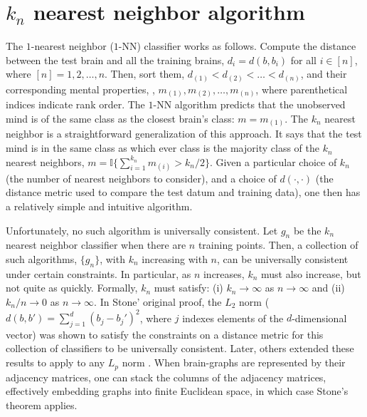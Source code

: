 \documentclass{article}
\newcommand{\conv}{\rightarrow}
\newcommand{\PP}{\mathbb{P}}           %
\newcommand{\II}{\mathbb{I}}           %
\newcommand{\Real}{\mathbb{R}}           %
\providecommand{\mc}[1]{\mathcal{#1}}
\begin{document}
\section{$k_n$ nearest neighbor algorithm} %
\label{sec:knn}



The $1$-nearest neighbor ($1$-NN) classifier works as follows.  Compute the distance between the test brain and all the training brains, $d_i=d(b,b_i)$ for all $i \in [n]$, where $[n]=1,2,\ldots, n$.  Then, sort them, $d_{(1)} < d_{(2)} < \ldots < d_{(n)}$, and their corresponding mental properties, , $m_{(1)}, m_{(2)}, \ldots, m_{(n)}$, where parenthetical indices indicate rank order.  %
The $1$-NN algorithm predicts that the unobserved mind is of the same class as the closest brain's class: $m=m_{(1)}$.  The $k_n$ nearest neighbor is a straightforward generalization of this approach.  It says that the test mind is in the same class as which ever class is the majority class of the $k_n$ nearest neighbors, $m=\II\{\sum_{i=1}^{k_n} m_{(i)} > k_n/2\}$.  Given a particular choice of $k_n$ (the number of nearest neighbors to consider), and a choice of $d(\cdot,\cdot)$ (the distance metric used to compare the test datum and training data), one then has a relatively simple and intuitive algorithm.  

Unfortunately, no such algorithm is universally consistent.  Let $g_n$ be the $k_n$ nearest neighbor classifier when there are $n$ training points.  Then, a collection of such algorithms, $\{g_n\}$,  with $k_n$ increasing with $n$, can be universally consistent under certain constraints. In particular, as $n$ increases, $k_n$ must also increase, but not quite as quickly.  Formally, $k_n$ must satisfy: (i) $k_n \conv \infty$ as $n \conv \infty$ and (ii) $k_n/n \conv 0$ as $n\conv\infty$. In Stone' original proof, the $L_2$ norm ($d(b,b')=\sum_{j=1}^d (b_j-b_j')^2$, where $j$ indexes elements of the $d$-dimensional vector) was shown to satisfy the constraints on a distance metric for this collection of classifiers to be universally consistent.  Later, others extended these results to apply to any $L_p$ norm \cite{DGL96}.  When brain-graphs are represented by their adjacency matrices, one can stack the columns of the adjacency matrices, effectively embedding graphs into finite Euclidean space, in which case Stone's theorem applies.
\end{document}
